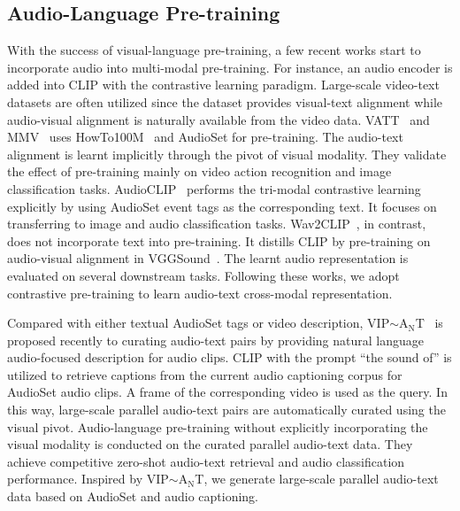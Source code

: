 \documentclass[sigconf,anonymous,review]{acmart}
\begin{document}
\subsection{Audio-Language Pre-training}
With the success of visual-language pre-training, a few recent works start to incorporate audio into multi-modal pre-training.
For instance, an audio encoder is added into CLIP with the contrastive learning paradigm.
Large-scale video-text datasets are often utilized since the dataset provides visual-text alignment while audio-visual alignment is naturally available from the video data.
VATT~\cite{akbari2021vatt} and MMV~\cite{alayrac2020self} uses HowTo100M~\cite{miech2019howto100m} and AudioSet for pre-training.
The audio-text alignment is learnt implicitly through the pivot of visual modality.
They validate the effect of pre-training mainly on video action recognition and image classification tasks.
AudioCLIP~\cite{guzhov2021audioclip} performs the tri-modal contrastive learning explicitly by using AudioSet event tags as the corresponding text.
It focuses on transferring to image and audio classification tasks.
Wav2CLIP~\cite{wu2021wav2clip}, in contrast, does not incorporate text into pre-training.
It distills CLIP by pre-training on audio-visual alignment in VGGSound~\cite{chen2020vggsound}.
The learnt audio representation is evaluated on several downstream tasks.
Following these works, we adopt contrastive pre-training to learn audio-text cross-modal representation.

Compared with either textual AudioSet tags or video description, VIP$\sim$A$_\text{N}$T~\cite{zhao2021connecting} is proposed recently to curating audio-text pairs by providing natural language audio-focused description for audio clips.
CLIP with the prompt ``the sound of'' is utilized to retrieve captions from the current audio captioning corpus for AudioSet audio clips.
A frame of the corresponding video is used as the query.
In this way, large-scale parallel audio-text pairs are automatically curated using the visual pivot.
Audio-language pre-training without explicitly incorporating the visual modality is conducted on the curated parallel audio-text data.
They achieve competitive zero-shot audio-text retrieval and audio classification performance.
Inspired by VIP$\sim$A$_\text{N}$T, we generate large-scale parallel audio-text data based on AudioSet and audio captioning.
\end{document}
